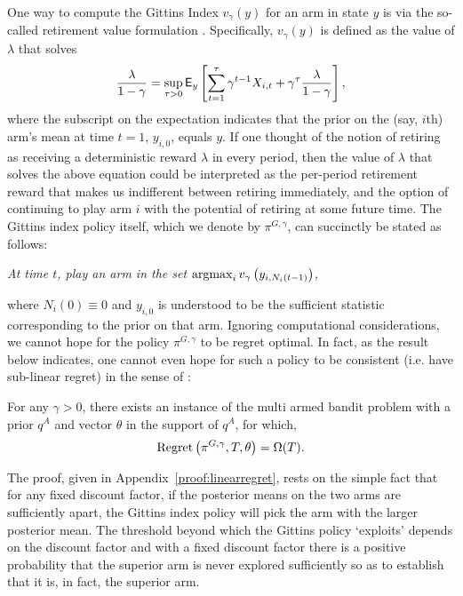 One way to compute the Gittins Index $v_\gamma(y)$ for an arm in state $y$ is via the so-called retirement value formulation \citep{whittle1980multi}. Specifically, $v_\gamma(y)$ is defined as the value of $\lambda$ that solves
\begin{equation} \label{eqn:gittins_index}
\frac{\lambda}{1-\gamma} = \sup_{\tau > 0}\mathsf{E}_{y}\left[\sum_{t=1}^{\tau} \gamma^{t-1} X_{i,t} + \gamma^{\tau} \frac{\lambda}{1-\gamma}
\right],
\end{equation}
where the subscript on the expectation indicates that the prior on the (say, $i$th) arm's mean at time $t=1$, $y_{i,0}$, equals $y$. If one thought of the notion of retiring as receiving a deterministic reward $\lambda$ in every period, then the value of $\lambda$ that solves the above equation could be interpreted as the per-period retirement reward that makes us indifferent between retiring immediately, and the option of continuing to play arm $i$ with the potential of retiring at some future time. The Gittins index policy itself, which we denote by $\pi^{G,\gamma}$, can succinctly be stated as follows: 
\begin{center}
{\em At time $t$, play an arm in the set 
$\operatorname*{\mathrm{argmax}}_{i} v_\gamma
\left(
y_{i,N_i(t-1)}
\right)$,
} 
\end{center}
where $N_i(0) \equiv 0$ and $y_{i,0}$ is understood to be the sufficient statistic corresponding to the prior on that arm. Ignoring computational considerations, we cannot hope for the policy $\pi^{G,\gamma}$ to be regret optimal. In fact, as the result below indicates, one cannot even hope for such a policy to be consistent (i.e. have sub-linear regret) in the sense of \cite{lai1985asymptotically}:
{
\color{blue}
\begin{lemma}
\label{le:linearregret}
	
	For any $\gamma > 0$, there exists an instance of the multi armed bandit problem with a prior $q^A$ and vector $\theta$ in the support of $q^A$, for which,
	\[
	{\rm Regret}\left(
	\pi^{G,\gamma},T,\theta
	\right)
	= 
	\Omega(T).
	\]
\end{lemma}
}
The proof, given in Appendix~\ref{proof:linearregret}, rests on the simple fact that for any fixed discount factor, if the posterior means on the two arms are sufficiently apart, the Gittins index policy will pick the arm with the larger posterior mean. The threshold beyond which the Gittins policy `exploits' depends on the discount factor and with a fixed discount factor there is a positive probability that the superior arm is never explored sufficiently so as to establish that it is, in fact, the superior arm. 

